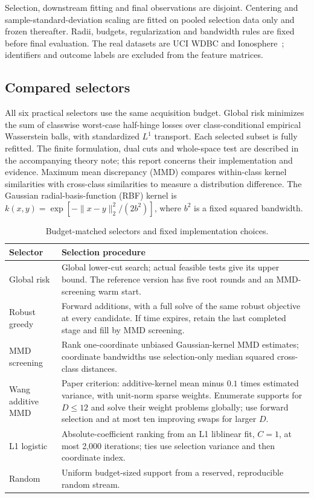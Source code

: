 \documentclass[11pt,a4paper]{article}
\begin{document}
Selection, downstream fitting and final observations are disjoint. Centering and
sample-standard-deviation scaling are fitted on pooled selection data only and
frozen thereafter. Radii, budgets, regularization and bandwidth rules are fixed
before final evaluation. The real datasets are UCI WDBC and Ionosphere~\cite{wdbc,ionosphere};
identifiers and outcome labels are excluded from the feature matrices.

\subsection{Compared selectors}
All six practical selectors use the same acquisition budget. Global risk minimizes
the sum of classwise worst-case half-hinge losses over class-conditional empirical
Wasserstein balls, with standardized $L^1$ transport. Each selected subset is fully
refitted. The finite formulation, dual cuts and whole-space test are described in
the accompanying theory note; this report concerns their implementation and evidence.
Maximum mean discrepancy (MMD) compares within-class kernel similarities with
cross-class similarities to measure a distribution difference. The Gaussian
radial-basis-function (RBF) kernel is
$k(x,y)=\exp[-\|x-y\|_2^2/(2b^2)]$, where $b^2$ is a fixed squared bandwidth.
\begin{table}[tbp]\centering\small
\caption{Budget-matched selectors and fixed implementation choices.}\label{tab:selectors}
\begin{tabularx}{\linewidth}{@{}p{26mm}Y@{}}\toprule
Selector & Selection procedure\\\midrule
Global risk & Global lower-cut search; actual feasible tests give its upper bound. The reference version has five root rounds and an MMD-screening warm start.\\
Robust greedy & Forward additions, with a full solve of the same robust objective at every candidate. If time expires, retain the last completed stage and fill by MMD screening.\\
MMD screening & Rank one-coordinate unbiased Gaussian-kernel MMD estimates; coordinate bandwidths use selection-only median squared cross-class distances.\\
Wang additive MMD & Paper criterion: additive-kernel mean minus $0.1$ times estimated variance, with unit-norm sparse weights. Enumerate supports for $D\le12$ and solve their weight problems globally; use forward selection and at most ten improving swaps for larger $D$.\\
L1 logistic & Absolute-coefficient ranking from an L1 liblinear fit, $C=1$, at most 2,000 iterations; ties use selection variance and then coordinate index.\\
Random & Uniform budget-sized support from a reserved, reproducible random stream.\\\bottomrule
\end{tabularx}\end{table}
\end{document}
